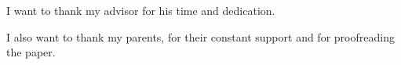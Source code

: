 
I want to thank my advisor for his time and dedication.
 
 I also want to thank my parents, for their constant support and for proofreading the paper. 